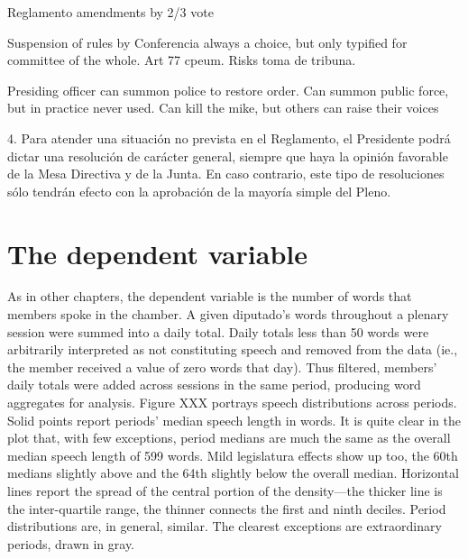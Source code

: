 \documentclass[letter,12pt]{article}
\begin{document}
Reglamento amendments by 2/3 vote

Suspension of rules by Conferencia always a choice, but only typified for committee of the whole. Art 77 cpeum. Risks toma de tribuna.

Presiding officer can summon police to restore order. 
Can summon public force, but in practice never used. 
Can kill the mike, but others can raise their voices

4. Para atender una situación no prevista en el Reglamento, el Presidente podrá dictar una resolución de carácter general, siempre que haya la opinión favorable de la Mesa Directiva y de la Junta. En caso contrario, este tipo de resoluciones sólo tendrán efecto con la aprobación de la mayoría simple del Pleno.

\section{The dependent variable}

As in other chapters, the dependent variable is the number of words that members spoke in the chamber. A given diputado's words throughout a plenary session were summed into a daily total. Daily totals less than 50 words were arbitrarily interpreted as not constituting speech and removed from the data (ie., the member received a value of zero words that day). Thus filtered, members' daily totals were added across sessions in the same period, producing word aggregates for analysis. Figure XXX portrays speech distributions across periods. Solid points report periods' median speech length in words. It is quite clear in the plot that, with few exceptions, period medians are much the same as the overall median speech length of 599 words. Mild legislatura effects show up too, the 60th medians slightly above and the 64th slightly below the overall median. Horizontal lines report the spread of the central portion of the density---the thicker line is the inter-quartile range, the thinner connects the first and ninth deciles. Period distributions are, in general, similar. The clearest exceptions are extraordinary periods, drawn in gray. 
\end{document}
